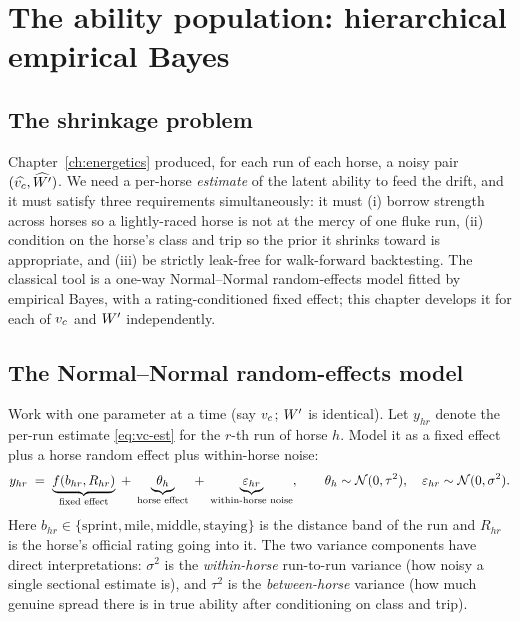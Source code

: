 \chapter{The ability population: hierarchical empirical Bayes}
\label{ch:pop}

\section{The shrinkage problem}

Chapter~\ref{ch:energetics} produced, for each run of each horse, a noisy pair
$(\widehat{{v_{c}}},\widehat{{W^{\prime}}})$. We need a per-horse \emph{estimate} of the latent ability to feed the
drift, and it must satisfy three requirements simultaneously: it must (i) borrow strength across
horses so a lightly-raced horse is not at the mercy of one fluke run, (ii) condition on the
horse's class and trip so the prior it shrinks toward is appropriate, and (iii) be strictly
leak-free for walk-forward backtesting. The classical tool is a one-way Normal--Normal
random-effects model fitted by empirical Bayes, with a rating-conditioned fixed effect; this
chapter develops it for each of ${v_{c}}$ and ${W^{\prime}}$ independently.

\section{The Normal--Normal random-effects model}

Work with one parameter at a time (say ${v_{c}}$; ${W^{\prime}}$ is identical). Let $y_{hr}$ denote the per-run
estimate \eqref{eq:vc-est} for the $r$-th run of horse $h$. Model it as a fixed effect plus a
horse random effect plus within-horse noise:
\begin{equation}
  y_{hr} \;=\; \underbrace{f(b_{hr}, R_{hr})}_{\text{fixed effect}}
            \;+\; \underbrace{\theta_h}_{\text{horse effect}}
            \;+\; \underbrace{\varepsilon_{hr}}_{\text{within-horse noise}},
  \qquad
  \theta_h \sim \mathcal{N}(0,\tau^2), \quad \varepsilon_{hr}\sim\mathcal{N}(0,\sigma^2).
  \label{eq:randeff}
\end{equation}
Here $b_{hr}\in\{\text{sprint},\text{mile},\text{middle},\text{staying}\}$ is the distance band
of the run and $R_{hr}$ is the horse's official rating going into it. The two variance components
have direct interpretations: $\sigma^2$ is the \emph{within-horse} run-to-run variance (how noisy
a single sectional estimate is), and $\tau^2$ is the \emph{between-horse} variance (how much
genuine spread there is in true ability after conditioning on class and trip).

